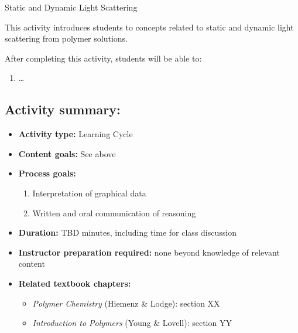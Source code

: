 %
%
%
%

\renewcommand{\figpath}{content/polymphys/scattering/light-scattering/figs}
\renewcommand{\labelbase}{light-scattering}

\begin{activity}{Static and Dynamic Light Scattering}
\label{\labelbase}

\begin{instructornotes}
	This activity introduces students to concepts related to static and dynamic light scattering from polymer solutions.
	
	After completing this activity, students will be able to:
	\begin{enumerate}
		\item \dots
	\end{enumerate}
	
	\subsection*{Activity summary:}
	\begin{itemize}
		\item \textbf{Activity type:} Learning Cycle
		\item \textbf{Content goals:} See above 
		\item \textbf{Process goals:} %
			\begin{enumerate}
				\item Interpretation of graphical data
				\item Written and oral communication of reasoning
			\end{enumerate}
		\item \textbf{Duration:} TBD minutes, including time for class discussion
		\item \textbf{Instructor preparation required:} none beyond knowledge of relevant content
		\item \textbf{Related textbook chapters:}
			\begin{itemize}
				\item \emph{Polymer Chemistry} (Hiemenz \& Lodge): section XX
				\item \emph{Introduction to Polymers} (Young \& Lovell): section YY
			\end{itemize}
	\end{itemize}
	

\end{instructornotes}
\end{activity}
